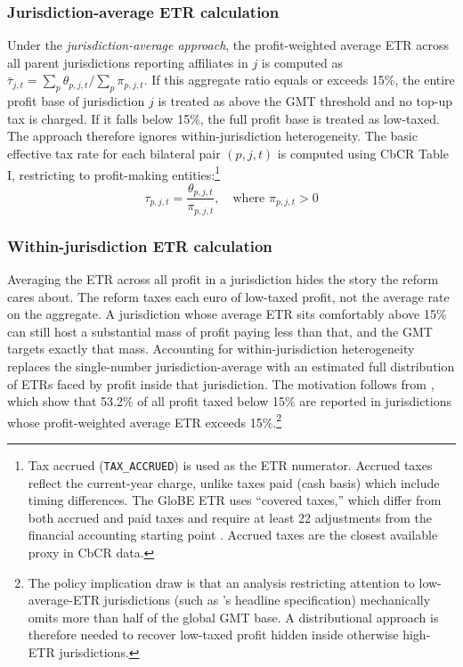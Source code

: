 \documentclass[11pt,a4paper]{article}
\newcommand{\code}[1]{\texttt{#1}}
\begin{document}
\subsubsection{Jurisdiction-average ETR calculation}\label{sec:etr_calc}

Under the \emph{jurisdiction-average approach}, the profit-weighted average ETR across all parent jurisdictions reporting affiliates in $j$ is computed as $\bar{\tau}_{j,t} = \sum_p \theta_{p,j,t} / \sum_p \pi_{p,j,t}$. If this aggregate ratio equals or exceeds 15\%, the entire profit base of jurisdiction $j$ is treated as above the GMT threshold and no top-up tax is charged. If it falls below 15\%, the full profit base is treated as low-taxed. The approach therefore ignores within-jurisdiction heterogeneity. The basic effective tax rate for each bilateral pair $(p, j, t)$ is computed using CbCR Table I, restricting to profit-making entities:\footnote{Tax accrued (\code{TAX\_ACCRUED}) is used as the ETR numerator. Accrued taxes reflect the current-year charge, unlike taxes paid (cash basis) which include timing differences. The GloBE ETR uses ``covered taxes,'' which differ from both accrued and paid taxes and require at least 22 adjustments from the financial accounting starting point \citep{hanlon2023}. Accrued taxes are the closest available proxy in CbCR data.}
\begin{equation}\label{eq:etr}
\tau_{p,j,t} = \frac{\theta_{p,j,t}}{\pi_{p,j,t}}, \quad \text{where } \pi_{p,j,t} > 0
\end{equation}

\subsubsection{Within-jurisdiction ETR calculation}\label{sec:distributional}

Averaging the ETR across all profit in a jurisdiction hides the story the reform cares about. The reform taxes each euro of low-taxed profit, not the average rate on the aggregate. A jurisdiction whose average ETR sits comfortably above 15\% can still host a substantial mass of profit paying less than that, and the GMT targets exactly that mass. Accounting for within-jurisdiction heterogeneity replaces the single-number jurisdiction-average with an estimated full distribution of ETRs faced by profit inside that jurisdiction. The motivation follows from \citet{hugger2026}, which show that 53.2\% of all profit taxed below 15\% are reported in jurisdictions whose profit-weighted average ETR exceeds 15\%.\footnote{The policy implication \citet{hugger2026} draw is that an analysis restricting attention to low-average-ETR jurisdictions (such as \citet{barake2022}'s headline specification) mechanically omits more than half of the global GMT base. A distributional approach is therefore needed to recover low-taxed profit hidden inside otherwise high-ETR jurisdictions.} 
\end{document}
